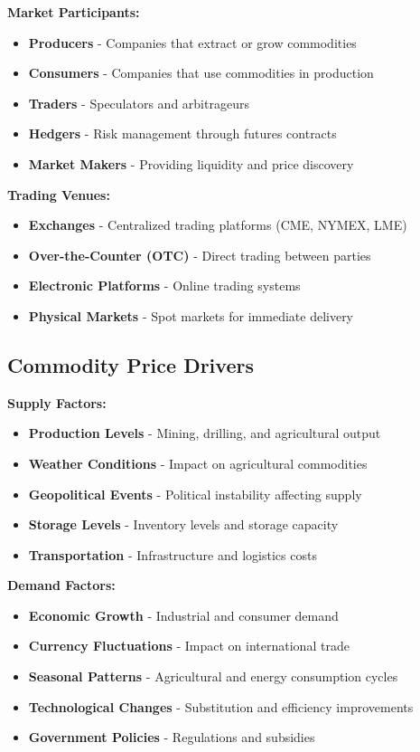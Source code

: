 \documentclass[12pt]{article}
\begin{document}
\textbf{Market Participants:}
\begin{itemize}
    \item \textbf{Producers} - Companies that extract or grow commodities
    \item \textbf{Consumers} - Companies that use commodities in production
    \item \textbf{Traders} - Speculators and arbitrageurs
    \item \textbf{Hedgers} - Risk management through futures contracts
    \item \textbf{Market Makers} - Providing liquidity and price discovery
\end{itemize}

\textbf{Trading Venues:}
\begin{itemize}
    \item \textbf{Exchanges} - Centralized trading platforms (CME, NYMEX, LME)
    \item \textbf{Over-the-Counter (OTC)} - Direct trading between parties
    \item \textbf{Electronic Platforms} - Online trading systems
    \item \textbf{Physical Markets} - Spot markets for immediate delivery
\end{itemize}

\subsection{Commodity Price Drivers}

\textbf{Supply Factors:}
\begin{itemize}
    \item \textbf{Production Levels} - Mining, drilling, and agricultural output
    \item \textbf{Weather Conditions} - Impact on agricultural commodities
    \item \textbf{Geopolitical Events} - Political instability affecting supply
    \item \textbf{Storage Levels} - Inventory levels and storage capacity
    \item \textbf{Transportation} - Infrastructure and logistics costs
\end{itemize}

\textbf{Demand Factors:}
\begin{itemize}
    \item \textbf{Economic Growth} - Industrial and consumer demand
    \item \textbf{Currency Fluctuations} - Impact on international trade
    \item \textbf{Seasonal Patterns} - Agricultural and energy consumption cycles
    \item \textbf{Technological Changes} - Substitution and efficiency improvements
    \item \textbf{Government Policies} - Regulations and subsidies
\end{itemize}
\end{document}
